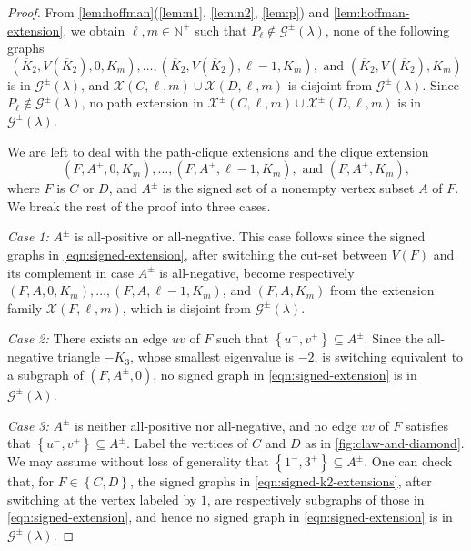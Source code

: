\documentclass[11pt]{article}
\theoremstyle{definition}
\theoremstyle{remark}
\newcommand{\sset}[1]{\left\{{#1}\right\}}
\newcommand{\la}{\lambda}
\newcommand{\G}{\mathcal{G}}
\newcommand{\N}{\mathbb{N}}
\newcommand{\X}{\mathcal{X}}
\newcommand{\Gs}{\G^\pm(\la)}
\begin{document}
\begin{proof}
    From \cref{lem:hoffman}(\ref{lem:n1}, \ref{lem:n2}, \ref{lem:p}) and \cref{lem:hoffman-extension}, we obtain $\ell, m \in \N^+$ such that $P_\ell \not\in \Gs$, none of the following graphs
    \begin{equation} \label{eqn:signed-k2-extensions}
        (\overline{K}_2, V(\overline{K}_2), 0, K_m), \dots, (\overline{K}_2, V(\overline{K}_2), \ell-1, K_m), \text{ and }(\overline{K}_2, V(\overline{K}_2), K_m)
    \end{equation}
    is in $\Gs$, and $\X(C, \ell, m) \cup \X(D, \ell, m)$ is disjoint from $\Gs$. Since $P_\ell \not\in \Gs$, no path extension in $\X^\pm(C, \ell, m) \cup \X^\pm(D, \ell, m)$ is in $\Gs$.
    
    We are left to deal with the path-clique extensions and the clique extension
    \begin{equation} \label{eqn:signed-extension}
        (F, A^\pm, 0, K_m), \dots, (F, A^\pm, \ell-1, K_m), \text{ and }(F, A^\pm, K_m),
    \end{equation}
    where $F$ is $C$ or $D$, and $A^\pm$ is the signed set of a nonempty vertex subset $A$ of $F$. We break the rest of the proof into three cases.
    
    \bigskip
    \noindent\textit{Case 1:} $A^\pm$ is all-positive or all-negative. This case follows since the signed graphs in \eqref{eqn:signed-extension}, after switching the cut-set between $V(F)$ and its complement in case $A^\pm$ is all-negative, become respectively $(F, A, 0, K_m), \dots, (F, A, \ell-1, K_m)$, and $(F, A, K_m)$ from the extension family $\X(F, \ell, m)$, which is disjoint from $\Gs$.
    
    \bigskip
    \noindent\textit{Case 2:} There exists an edge $uv$ of $F$ such that $\sset{u^-, v^+} \subseteq A^\pm$. Since the all-negative triangle $-K_3$, whose smallest eigenvalue is $-2$, is switching equivalent to a subgraph of $(F, A^\pm, 0)$, no signed graph in \eqref{eqn:signed-extension} is in $\Gs$.

    \bigskip
    \noindent\textit{Case 3:} $A^\pm$ is neither all-positive nor all-negative, and no edge $uv$ of $F$ satisfies that $\sset{u^-, v^+} \subseteq A^\pm$. Label the vertices of $C$ and $D$ as in \cref{fig:claw-and-diamond}. We may assume without loss of generality that $\sset{1^-, 3^+} \subseteq A^\pm$. One can check that, for $F \in \sset{C, D}$, the signed graphs in \eqref{eqn:signed-k2-extensions}, after switching at the vertex labeled by $1$, are respectively subgraphs of those in \eqref{eqn:signed-extension}, and hence no signed graph in \eqref{eqn:signed-extension} is in $\Gs$.
\end{proof}
\end{document}
